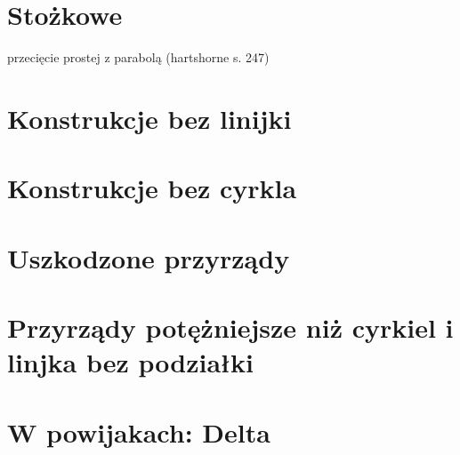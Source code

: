 \section{Stożkowe}
przecięcie prostej z parabolą (hartshorne s. 247)


\section{Konstrukcje bez linijki}



\section{Konstrukcje bez cyrkla}


\section{Uszkodzone przyrządy}


\section{Przyrządy potężniejsze niż cyrkiel i linjka bez podziałki}


\section{W powijakach: Delta}

